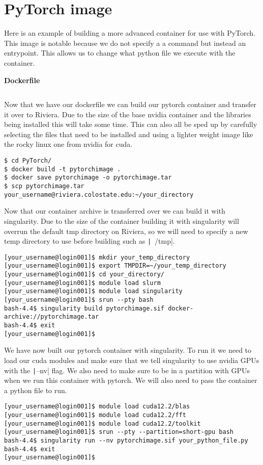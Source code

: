 \documentclass[11pt,letterpaper]{article}
\begin{document}
\section{PyTorch image}
Here is an example of building a more advanced container for use with PyTorch. This image is notable because we do not specify a a command but instead an entrypoint. This allows us to change what python file we execute with the container.

\noindent\textbf{Dockerfile}\vspace{-1em}
\inputminted{docker}{Dockerfiles/PyTorch/Dockerfile}

Now that we have our dockerfile we can build our pytorch container and transfer it over to Riviera. Due to the size of the base nvidia container and the libraries being installed this will take some time. This can also all be sped up by carefully selecting the files that need to be installed and using a lighter weight image like the rocky linux one from nvidia for cuda.

\begin{verbatim}
$ cd PyTorch/
$ docker build -t pytorchimage .
$ docker save pytorchimage -o pytorchimage.tar
$ scp pytorchimage.tar your_username@riviera.colostate.edu:~/your_directory
\end{verbatim}

Now that our container archive is transferred over we can build it with singularity. Due to the size of the container building it with singularity will overrun the default tmp directory on Riviera, so we will need to specify a new temp directory to use before building such as \texttt|~/tmp|.

\begin{verbatim}
[your_username@login001]$ mkdir your_temp_directory
[your_username@login001]$ export TMPDIR=~/your_temp_directory
[your_username@login001]$ cd your_directory/
[your_username@login001]$ module load slurm
[your_username@login001]$ module load singularity
[your_username@login001]$ srun --pty bash
bash-4.4$ singularity build pytorchimage.sif docker-archive://pytorchimage.tar
bash-4.4$ exit
[your_username@login001]$
\end{verbatim}

We have now built our pytorch container with singularity. To run it we need to load our cuda modules and make sure that we tell singularity to use nvidia GPUs with the \texttt|--nv| flag. We also need to make sure to be in a partition with GPUs when we run this container with pytorch. We will also need to pass the container a python file to run.

\begin{verbatim}
[your_username@login001]$ module load cuda12.2/blas
[your_username@login001]$ module load cuda12.2/fft
[your_username@login001]$ module load cuda12.2/toolkit
[your_username@login001]$ srun --pty --partition=short-gpu bash
bash-4.4$ singularity run --nv pytorchimage.sif your_python_file.py
bash-4.4$ exit
[your_username@login001]$
\end{verbatim}
\end{document}
